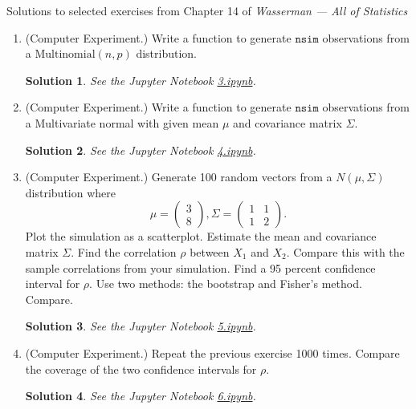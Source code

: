 \documentclass[10pt]{article}
\newtheorem*{sol}{Solution}
\begin{document}
\noindent \large{Solutions to selected exercises from Chapter 14 of
\emph{Wasserman --- All of Statistics}}

\begin{enumerate}

\item[(3)] (Computer Experiment.) Write a function to generate $\texttt{nsim}$
observations from a $\text{Multinomial}(n,p)$ distribution.

\begin{sol}
See the Jupyter Notebook
\href{https://github.com/ajrasmus/some_of_statistics/blob/main/chapter_14/3.ipynb}{3.ipynb}.
\end{sol}

\item[(4)] (Computer Experiment.) Write a function to generate $\texttt{nsim}$
observations from a Multivariate normal with given mean $\mu$ and
covariance matrix $\Sigma$.

\begin{sol}
See the Jupyter Notebook
\href{https://github.com/ajrasmus/some_of_statistics/blob/main/chapter_14/4.ipynb}{4.ipynb}.
\end{sol}

\item[(5)] (Computer Experiment.) Generate 100 random vectors from a $N(\mu,\Sigma)$
distribution where
\[
\mu = \begin{pmatrix} 3 \\ 8 \end{pmatrix},
\Sigma = \begin{pmatrix} 1 & 1 \\ 1 & 2 \end{pmatrix}.
\]
Plot the simulation as a scatterplot. Estimate the mean and covariance
matrix $\Sigma$. Find the correlation $\rho$ between $X_1$ and $X_2$. Compare this
with the sample correlations from your simulation. Find a 95 percent
confidence interval for $\rho$. Use two methods: the bootstrap and Fisher's
method. Compare.

\begin{sol}
See the Jupyter Notebook
\href{https://github.com/ajrasmus/some_of_statistics/blob/main/chapter_14/5.ipynb}{5.ipynb}.
\end{sol}

\item[(6)] (Computer Experiment.) Repeat the previous exercise 1000 times. Compare
the coverage of the two confidence intervals for $\rho$.

\begin{sol}
See the Jupyter Notebook
\href{https://github.com/ajrasmus/some_of_statistics/blob/main/chapter_14/6.ipynb}{6.ipynb}.
\end{sol}

\end{enumerate}
\end{document}
